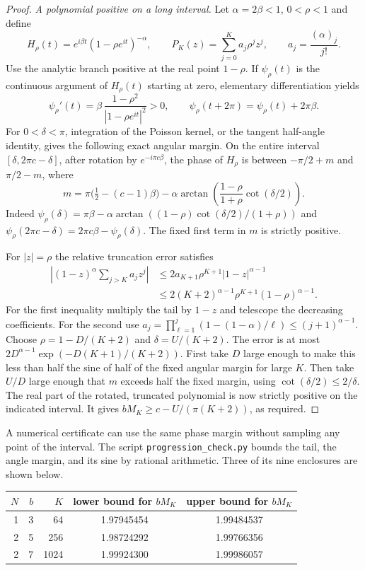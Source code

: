 \documentclass[11pt,letterpaper]{article}
\theoremstyle{remark}\newtheorem{remark}[theorem]{Remark}
\begin{document}
\begin{proof}
\emph{A polynomial positive on a long interval.}
Let $\alpha=2\beta<1$, $0<\rho<1$ and define
\[
 H_\rho(t)=e^{i\beta t}(1-\rho e^{it})^{-\alpha},\qquad
 P_K(z)=\sum_{j=0}^K a_j\rho^j z^j,\qquad
 a_j=\frac{(\alpha)_j}{j!}.
\]
Use the analytic branch positive at the real point $1-\rho$.
If $\psi_\rho(t)$ is the continuous argument of $H_\rho(t)$ starting at
zero, elementary differentiation yields
\[
 \psi_\rho'(t)=\beta\,\frac{1-\rho^2}{|1-\rho e^{it}|^2}>0,\qquad
 \psi_\rho(t+2\pi)=\psi_\rho(t)+2\pi\beta .
\]
For $0<\delta<\pi$, integration of the Poisson kernel, or the tangent
half-angle identity, gives the following exact angular margin. On the
entire interval $[\delta,2\pi c-\delta]$, after rotation by
$e^{-i\pi c\beta}$, the phase of $H_\rho$ is between
$-\pi/2+m$ and $\pi/2-m$, where
\[
 m=\pi\bigl(\tfrac12-(c-1)\beta\bigr)
     -\alpha\arctan\!\left(\frac{1-\rho}{1+\rho}\cot(\delta/2)\right).
\]
Indeed $\psi_\rho(\delta)=\pi\beta-\alpha\arctan((1-\rho)
\cot(\delta/2)/(1+\rho))$ and
$\psi_\rho(2\pi c-\delta)=2\pi c\beta-\psi_\rho(\delta)$.
The fixed first term in $m$ is strictly positive.

For $|z|=\rho$ the relative truncation error satisfies
\begin{align*}
 \left|(1-z)^\alpha\sum_{j>K}a_jz^j\right|
 &\le 2a_{K+1}\rho^{K+1}|1-z|^{\alpha-1}\\
 &\le 2(K+2)^{\alpha-1}\rho^{K+1}(1-\rho)^{\alpha-1}.
\end{align*}
For the first inequality multiply the tail by $1-z$ and telescope the
decreasing coefficients. For the second use
$a_j=\prod_{\ell=1}^j(1-(1-\alpha)/\ell)\le (j+1)^{\alpha-1}$.
Choose $\rho=1-D/(K+2)$ and $\delta=U/(K+2)$.
The error is at most $2D^{\alpha-1}\exp(-D(K+1)/(K+2))$. First take
$D$ large enough to make this less than half the sine of half of the
fixed angular margin for large $K$. Then take $U/D$ large enough that $m$
exceeds half the fixed margin, using $\cot(\delta/2)\le2/\delta$.
The real part of the rotated, truncated polynomial is now strictly
positive on the indicated interval. It gives
$bM_K\ge c-U/(\pi(K+2))$, as required.
\end{proof}

A numerical certificate can use the same phase margin without sampling
any point of the interval. The script \texttt{progression\_check.py}
bounds the tail, the angle margin, and its sine by rational arithmetic.
Three of its nine enclosures are shown below.
\begin{center}
\begin{tabular}{rrrcc}
\toprule
$N$ & $b$ & $K$ & lower bound for $bM_K$ & upper bound for $bM_K$\\
\midrule
1 & 3 & 64 & 1.97945454 & 1.99484537\\
2 & 5 & 256 & 1.98724292 & 1.99766356\\
2 & 7 & 1024 & 1.99924300 & 1.99986057\\
\bottomrule
\end{tabular}
\end{center}
\end{document}
